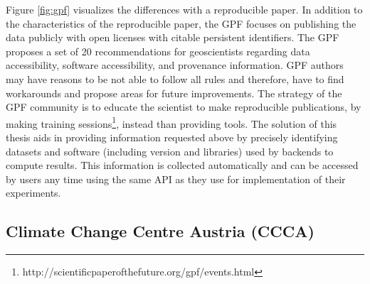 \documentclass[draft,final]{vutinfth} %
\begin{document}
Figure \ref{fig:gpf} visualizes the differences with a reproducible paper. In addition to the characteristics of the reproducible paper, the GPF focuses on publishing the data publicly with open licenses with citable persistent identifiers.
The GPF proposes a set of 20 recommendations for geoscientists regarding data accessibility, software accessibility, and provenance information. GPF authors may have reasons to be not able to follow all rules and therefore, have to find workarounds and propose areas for future improvements. The strategy of the GPF community is to educate the scientist to make reproducible publications, by making training sessions\footnote{http://scientificpaperofthefuture.org/gpf/events.html}, instead than providing tools. The solution of this thesis aids in providing information requested above by precisely identifying datasets and software (including version and libraries) used by backends to compute results. This information is collected automatically and can be accessed by users any time using the same API as they use for implementation of their experiments.  

\subsection{Climate Change Centre Austria (CCCA)}
\end{document}
